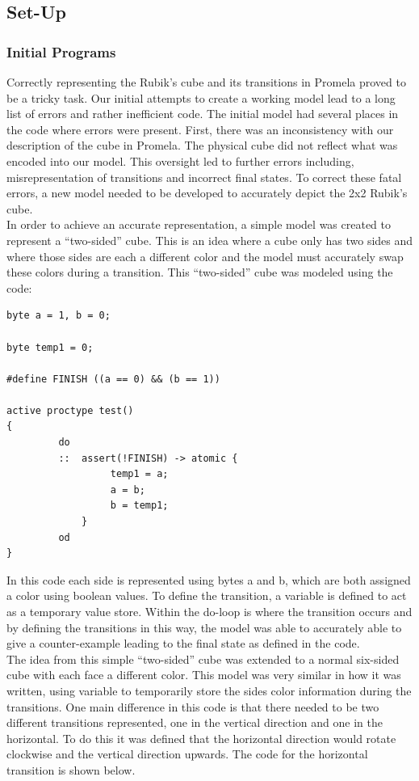 \documentclass{article}
\begin{document}
\subsection{Set-Up}
\subsubsection{Initial Programs}
Correctly representing the Rubik's cube and its transitions in Promela proved to be a tricky task. Our initial attempts to create a working model lead to a long list of errors and rather inefficient code. The initial model had several places in the code where errors were present. First, there was an inconsistency with our description of the cube in Promela. The physical cube did not reflect what was encoded into our model. This oversight led to further errors including, misrepresentation of transitions and incorrect final states. To correct these fatal errors, a new model needed to be developed to accurately depict the 2x2 Rubik's cube.\\[3mm]
In order to achieve an accurate representation, a simple model was created to represent a ``two-sided'' cube. This is an idea where a cube only has two sides and where those sides are each a different color and the model must accurately swap these colors during a transition.  This ``two-sided'' cube was modeled using the code: 
\begin{verbatim}
byte a = 1, b = 0;

byte temp1 = 0;

#define FINISH ((a == 0) && (b == 1))

active proctype test()
{
	     do
	     ::  assert(!FINISH) -> atomic {
		          temp1 = a;
		          a = b;
		          b = temp1;
	         }
	     od
}

\end{verbatim}
In this code each side is represented using bytes a and b, which are both assigned a color using boolean values. To define the transition, a variable is defined to act as a temporary value store. Within the do-loop is where the transition occurs and by defining the transitions in this way, the model was able to accurately able to give a counter-example leading to the final state as defined in the code. \\[3mm]
The idea from this simple ``two-sided'' cube was extended to a normal six-sided cube with each face a different color. This model was very similar in how it was written, using variable to temporarily store the sides color information during the transitions. One main difference in this code is that there needed to be two different transitions represented, one in the vertical direction and one in the  horizontal. To do this it was defined that the horizontal direction would rotate clockwise and the vertical direction upwards. The code for the horizontal transition is shown below. 
\end{document}
